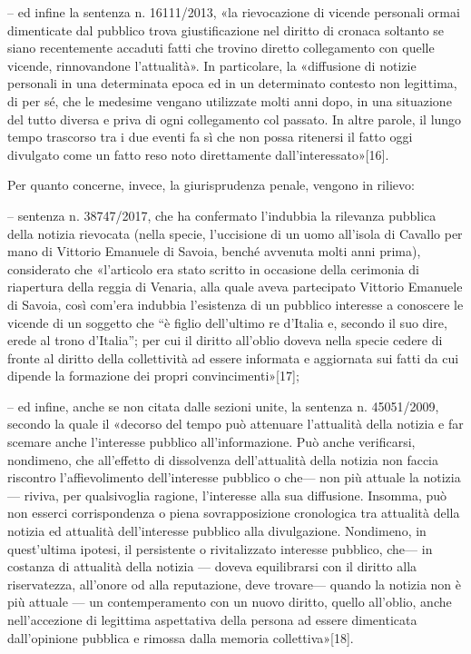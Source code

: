 – ed infine la sentenza n. 16111/2013, «la rievocazione di vicende personali ormai dimenticate dal pubblico trova giustificazione nel diritto di cronaca soltanto se siano recentemente accaduti fatti che trovino diretto collegamento con quelle vicende, rinnovandone l’attualità». In particolare, la «diffusione di notizie personali in una determinata epoca ed in un determinato contesto non legittima, di per sé, che le medesime vengano utilizzate molti anni dopo, in una situazione del tutto diversa e priva di ogni collegamento col passato. In altre parole, il lungo tempo trascorso tra i due eventi fa sì che non possa ritenersi il fatto oggi divulgato come un fatto reso noto direttamente dall’interessato»[16].

Per quanto concerne, invece, la giurisprudenza penale, vengono in rilievo:

– sentenza n. 38747/2017, che ha confermato l’indubbia la rilevanza pubblica della notizia rievocata (nella specie, l’uccisione di un uomo all’isola di Cavallo per mano di Vittorio Emanuele di Savoia, benché avvenuta molti anni prima), considerato che «l’articolo era stato scritto in occasione della cerimonia di riapertura della reggia di Venaria, alla quale aveva partecipato Vittorio Emanuele di Savoia, così com’era indubbia l’esistenza di un pubblico interesse a conoscere le vicende di un soggetto che “è figlio dell’ultimo re d’Italia e, secondo il suo dire, erede al trono d’Italia”; per cui il diritto all’oblio doveva nella specie cedere di fronte al diritto della collettività ad essere informata e aggiornata sui fatti da cui dipende la formazione dei propri convincimenti»[17];

– ed infine, anche se non citata dalle sezioni unite, la sentenza n. 45051/2009, secondo la quale il «decorso del tempo può attenuare l’attualità della notizia e far scemare anche l’interesse pubblico all’informazione. Può anche verificarsi, nondimeno, che all’effetto di dissolvenza dell’attualità della notizia non faccia riscontro l’affievolimento dell’interesse pubblico o che— non più attuale la notizia — riviva, per qualsivoglia ragione, l’interesse alla sua diffusione. Insomma, può non esserci corrispondenza o piena sovrapposizione cronologica tra attualità della notizia ed attualità dell’interesse pubblico alla divulgazione. Nondimeno, in quest’ultima ipotesi, il persistente o rivitalizzato interesse pubblico, che— in costanza di attualità della notizia — doveva equilibrarsi con il diritto alla riservatezza, all’onore od alla reputazione, deve trovare— quando la notizia non è più attuale — un contemperamento con un nuovo diritto, quello all’oblio, anche nell’accezione di legittima aspettativa della persona ad essere dimenticata dall’opinione pubblica e rimossa dalla memoria collettiva»[18].

